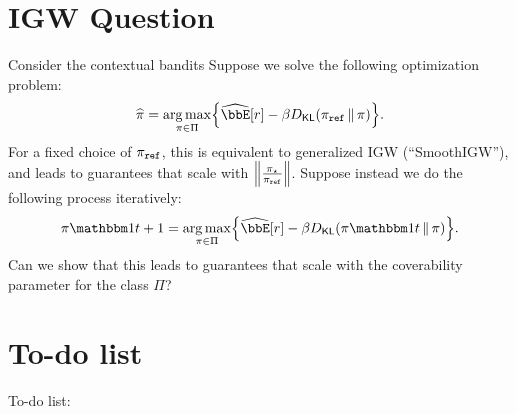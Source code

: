 \documentclass{article}
\begin{document}
\section{IGW Question}
Consider the contextual bandits
Suppose we solve the following optimization problem:
\[
  \pihat=\argmax_{\pi\in\Pi}\crl*{
    \Eh\brk*{r} - \beta\Dkl{\piref}{\pi}}.
\]
For a fixed choice of $\piref$, this is equivalent to generalized IGW
(``SmoothIGW''), and leads to guarantees that scale with
$\nrm*{\frac{\pistar}{\piref}}$. Suppose instead we do the following
process iteratively:
\[
  \pi\ind{t+1}=\argmax_{\pi\in\Pi}\crl*{
    \Eh\brk*{r} - \beta\Dkl{\pi\ind{t}}{\pi}}.
\]
Can we show that this leads to guarantees that scale with the
coverability parameter for the class $\Pi$?

\section{To-do list}
To-do list:
\end{document}
